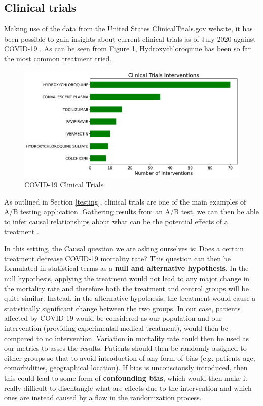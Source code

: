 \begin{appendices}
\section{Clinical trials}
\label{ab_trials}
Making use of the data from the United States ClinicalTrials.gov website, it has been possible to gain insights about current clinical trials as of July 2020 against COVID-19 \cite{trials_data}. As can be seen from Figure \ref{trials}, Hydroxychloroquine has been so far the most common treatment tried.
\vspace{-0.2cm}
\begin{figure}[ht!]%
    \centering
    \includegraphics[width=0.65\linewidth]{latex/images/trials.pdf}
    \vspace{-0.2cm}
    \caption{COVID-19 Clinical Trials}
    \label{trials}
\end{figure}
\vspace{-0.2cm}

As outlined in Section \ref{testing}, clinical trials are one of the main examples of A/B testing application. Gathering results from an A/B test, we can then be able to infer causal relationships about what can be the potential effects of a treatment \cite{power}.

In this setting, the Causal question we are asking ourselves is: Does a certain treatment decrease COVID-19 mortality rate? This question can then be formulated in statistical terms as a \textbf{null and alternative hypothesis}. In the null hypothesis, applying the treatment would not lead to any major change in the mortality rate and therefore both the treatment and control groups will be quite similar. Instead, in the alternative hypothesis, the treatment would cause a statistically significant change between the two groups. In our case, patients affected by COVID-19 would be considered as our population and our intervention (providing experimental medical treatment), would then be compared to no intervention. Variation in mortality rate could then be used as our metrics to asses the results. Patients should then be randomly assigned to either groups so that to avoid introduction of any form of bias (e.g. patients age, comorbidities, geographical location). If bias is unconsciously introduced, then this could lead to some form of \textbf{confounding bias}, which would then make it really difficult to disentangle what are effects due to the intervention and which ones are instead caused by a flaw in the randomization process. 


\end{appendices}

